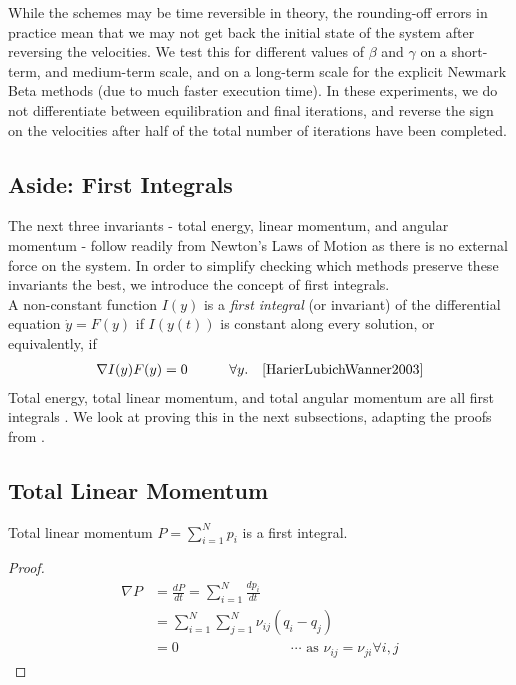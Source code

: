 \documentclass[../Main.tex]{subfiles}
\begin{document}
While the schemes may be time reversible in theory, the rounding-off errors in practice mean that we may not get back the initial state of the system after reversing the velocities. We test this for different values of $\beta$ and $\gamma$ on a short-term, and medium-term scale, and on a long-term scale for the explicit Newmark Beta methods (due to much faster execution time). In these experiments, we do not differentiate between equilibration and final iterations, and reverse the sign on the velocities after half of the total number of iterations have been completed.



\subsection*{Aside: First Integrals}
The next three invariants - total energy, linear momentum, and angular momentum - follow readily from Newton's Laws of Motion as there is no external force on the system. In order to simplify checking which methods preserve these invariants the best, we introduce the concept of first integrals. \\
A non-constant function $I(y)$ is a \textit{first integral} (or invariant) of the differential equation $\dot{y} = F(y)$ if $I(y(t))$ is constant along every solution, or equivalently, if
\begin{align}
\nabla I(y)F(y) = 0    \quad \quad \quad  \forall y. \quad \cite{HarierLubichWanner2003} \label{eqn:grad_first_integral_zero}
\end{align}
Total energy, total linear momentum, and total angular momentum are all first integrals \cite{HarierLubichWanner2003}. We look at proving this in the next subsections, adapting the proofs from \cite{HarierLubichWanner2003}.

\subsection{Total Linear Momentum}
 
\begin{theorem} Total linear momentum $P = \sum_{i=1}^{N} p_{i}$ is a first integral. \end{theorem}
\begin{proof}
\begin{align*}
\nabla P & = \frac{dP}{dt} = \sum_{i=1}^{N} \frac{dp_{i}}{dt} \\
&=\sum_{i=1}^{N}\sum_{j=1}^{N}\nu_{ij}\left(q_{i} - q_{j}\right) \\
& = 0 \qquad \qquad \qquad \qquad \cdots \mbox{ as }\nu_{ij} = \nu_{ji} \forall i, j
\end{align*}
\end{proof} 
\end{document}

